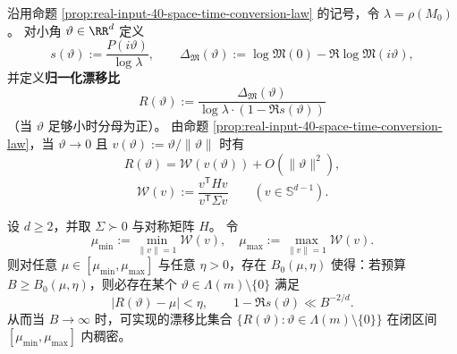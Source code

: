 \begin{definition}[归一化漂移比]\label{def:root-unit-normalized-drift-ratio}
沿用命题 \ref{prop:real-input-40-space-time-conversion-law} 的记号，令 \(\lambda=\rho(M_0)\)。
对小角 \(\vartheta\in\RR^d\) 定义
\[
s(\vartheta):=\frac{P(i\vartheta)}{\log\lambda},
\qquad
\Delta_{\mathfrak{M}}(\vartheta):=\log\mathfrak{M}(0)-\Re\log\mathfrak{M}(i\vartheta),
\]
并定义\textbf{归一化漂移比}
\[
R(\vartheta):=\frac{\Delta_{\mathfrak{M}}(\vartheta)}{\log\lambda\cdot(1-\Re s(\vartheta))}
\]
（当 \(\vartheta\) 足够小时分母为正）。
由命题 \ref{prop:real-input-40-space-time-conversion-law}，当 \(\vartheta\to 0\) 且 \(v(\vartheta):=\vartheta/\|\vartheta\|\) 时有
\[
R(\vartheta)=\mathcal{W}(v(\vartheta))+O(\|\vartheta\|^2),
\]
\[
\mathcal{W}(v):=\frac{v^{\mathsf T}Hv}{v^{\mathsf T}\Sigma v}\qquad(v\in\mathbb S^{d-1}).
\]
\end{definition}

\begin{theorem}[漂移比的连续谱带与可实现稠密性]\label{thm:root-unit-drift-ratio-dense-band}
设 \(d\ge 2\)，并取 \(\Sigma\succ 0\) 与对称矩阵 \(H\)。
令
\[
\mu_{\min}:=\min_{\|v\|=1}\mathcal{W}(v),\quad
\mu_{\max}:=\max_{\|v\|=1}\mathcal{W}(v).
\]
则对任意 \(\mu\in[\mu_{\min},\mu_{\max}]\) 与任意 \(\eta>0\)，存在 \(B_0(\mu,\eta)\) 使得：若预算 \(B\ge B_0(\mu,\eta)\)，则必存在某个 \(\vartheta\in \Lambda(m)\setminus\{0\}\) 满足
\[
|R(\vartheta)-\mu|<\eta,
\qquad
1-\Re s(\vartheta)\ll B^{-2/d}.
\]
从而当 \(B\to\infty\) 时，可实现的漂移比集合 \(\{R(\vartheta):\vartheta\in\Lambda(m)\setminus\{0\}\}\) 在闭区间 \([\mu_{\min},\mu_{\max}]\) 内稠密。
\end{theorem}


